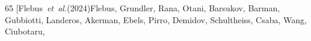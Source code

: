 \documentclass[aps,prb,reprint,twocolumns,superscriptaddress,nofootinbib]{revtex4-2}
\begin{document}
	
	\begin{thebibliography}{65}%
		\makeatletter
		\providecommand \@ifxundefined [1]{%
			\@ifx{#1\undefined}
		}%
		\providecommand \@ifnum [1]{%
			\ifnum #1\expandafter \@firstoftwo
			\else \expandafter \@secondoftwo
			\fi
		}%
		\providecommand \@ifx [1]{%
			\ifx #1\expandafter \@firstoftwo
			\else \expandafter \@secondoftwo
			\fi
		}%
		\providecommand \natexlab [1]{#1}%
		\providecommand \enquote  [1]{``#1''}%
		\providecommand \bibnamefont  [1]{#1}%
		\providecommand \bibfnamefont [1]{#1}%
		\providecommand \citenamefont [1]{#1}%
		\providecommand \href@noop [0]{\@secondoftwo}%
		\providecommand \href [0]{\begingroup \@sanitize@url \@href}%
		\providecommand \@href[1]{\@@startlink{#1}\@@href}%
		\providecommand \@@href[1]{\endgroup#1\@@endlink}%
		\providecommand \@sanitize@url [0]{\catcode `\\12\catcode `\$12\catcode
			`\&12\catcode `\#12\catcode `\^12\catcode `\_12\catcode `\%12\relax}%
		\providecommand \@@startlink[1]{}%
		\providecommand \@@endlink[0]{}%
		\providecommand \url  [0]{\begingroup\@sanitize@url \@url }%
		\providecommand \@url [1]{\endgroup\@href {#1}{\urlprefix }}%
		\providecommand \urlprefix  [0]{URL }%
		\providecommand \Eprint [0]{\href }%
		\providecommand \doibase [0]{https://doi.org/}%
		\providecommand \selectlanguage [0]{\@gobble}%
		\providecommand \bibinfo  [0]{\@secondoftwo}%
		\providecommand \bibfield  [0]{\@secondoftwo}%
		\providecommand \translation [1]{[#1]}%
		\providecommand \BibitemOpen [0]{}%
		\providecommand \bibitemStop [0]{}%
		\providecommand \bibitemNoStop [0]{.\EOS\space}%
		\providecommand \EOS [0]{\spacefactor3000\relax}%
		\providecommand \BibitemShut  [1]{\csname bibitem#1\endcsname}%
		\let\auto@bib@innerbib\@empty
		\bibitem [{\citenamefont {Flebus}\ \emph {et~al.}(2024)\citenamefont {Flebus},
			\citenamefont {Grundler}, \citenamefont {Rana}, \citenamefont {Otani},
			\citenamefont {Barsukov}, \citenamefont {Barman}, \citenamefont {Gubbiotti},
			\citenamefont {Landeros}, \citenamefont {Akerman}, \citenamefont {Ebels},
			\citenamefont {Pirro}, \citenamefont {Demidov}, \citenamefont {Schultheiss},
			\citenamefont {Csaba}, \citenamefont {Wang}, \citenamefont {Ciubotaru},
}
\end{thebibliography}
\end{document}
